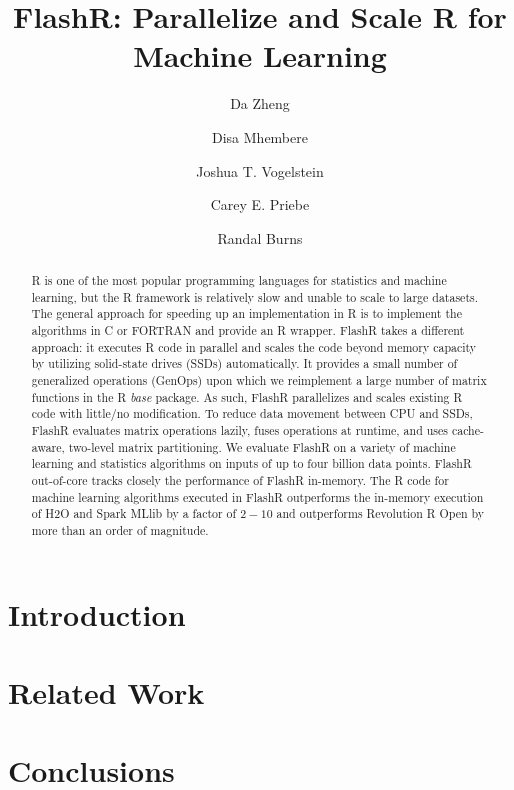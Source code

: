 \documentclass[letterpaper,twocolumn,10pt]{article}
\begin{document}
\title{FlashR: Parallelize and Scale R for Machine Learning}

\author[1]{\rm Da Zheng}
\author[1]{\rm Disa Mhembere}
\author[3]{\rm Joshua T. Vogelstein}
\author[2]{\rm Carey E. Priebe}
\author[1]{\rm Randal Burns}

\maketitle

\begin{abstract}
R is one of the most popular programming languages for statistics and machine
learning, but the R framework is relatively slow and unable to scale to large
datasets. The general approach for speeding up an implementation in R is to
implement the algorithms in C or FORTRAN and provide an R wrapper. FlashR takes
a different approach: it executes R code in parallel and scales the code beyond
memory capacity by utilizing solid-state drives (SSDs) automatically. It
provides a small number of generalized 
operations (GenOps) upon which we reimplement a large number of
matrix functions in the R \textit{base} package. As such, FlashR parallelizes
and scales existing R code with little/no modification. To reduce data movement
between CPU and SSDs, FlashR evaluates matrix operations lazily, fuses
operations at runtime, and uses cache-aware, two-level matrix partitioning.
We evaluate FlashR on a variety of machine learning and statistics algorithms 
on inputs of up to four billion data points.
FlashR out-of-core tracks closely the performance of FlashR in-memory.
The R code for machine learning algorithms executed in FlashR
outperforms the in-memory execution of H2O and Spark MLlib by a factor of
$2-10$ and outperforms Revolution R Open by more than an order of magnitude.
\end{abstract}

\section{Introduction}


\vspace{-10pt}
\section{Related Work}






\section{Conclusions}


{\footnotesize 
}
\end{document}
